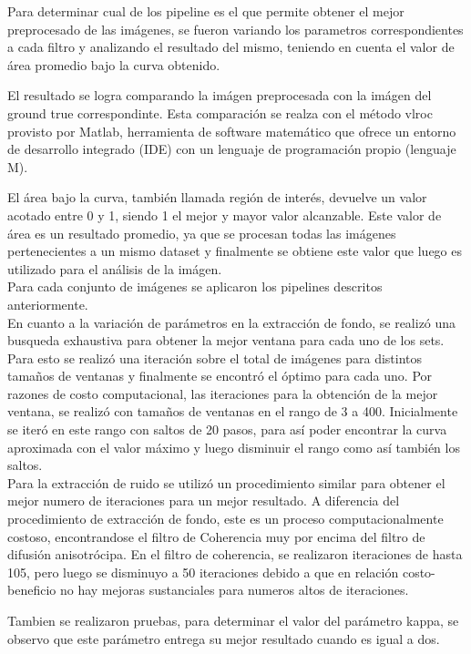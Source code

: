 Para determinar cual de los pipeline es el que permite obtener el mejor preprocesado de las imágenes, se fueron variando los parametros correspondientes a cada filtro y analizando el resultado del mismo, teniendo en cuenta el valor de área promedio bajo la curva obtenido.

El resultado se logra comparando la imágen preprocesada con la imágen del ground true correspondinte. Esta comparación se realza con el método vlroc provisto por Matlab,  herramienta de software matemático que ofrece un entorno de desarrollo integrado (IDE) con un lenguaje de programación propio (lenguaje M). 

El área bajo la curva, también llamada región de interés, devuelve un valor acotado entre 0 y 1, siendo 1 el mejor y mayor valor alcanzable. Este valor de área es un resultado promedio, ya que se procesan todas las imágenes pertenecientes a un mismo dataset y finalmente se obtiene este valor que luego es utilizado para el análisis de la imágen.\\

Para cada conjunto de imágenes se aplicaron los pipelines descritos anteriormente.\\
En cuanto a la variación de parámetros en la extracción de fondo, se realizó una busqueda exhaustiva para obtener la mejor ventana para cada uno de los sets. Para esto se realizó una iteración sobre el total de imágenes para distintos tamaños de ventanas y finalmente se encontró el óptimo para cada uno. Por razones de costo computacional, las iteraciones para la obtención de la mejor ventana, se realizó con tamaños de ventanas en el rango de 3 a 400. Inicialmente se iteró en este rango con saltos de 20 pasos, para así poder encontrar la curva aproximada con el valor máximo y luego disminuir el rango como así también los saltos.\\

Para la extracción de ruido se utilizó un procedimiento similar para obtener el mejor numero de iteraciones para un mejor resultado. A diferencia del procedimiento de extracción de fondo, este es un proceso computacionalmente costoso, encontrandose el filtro de Coherencia muy por encima del filtro de difusión anisotrócipa.
En el filtro de coherencia, se realizaron iteraciones de hasta 105, pero luego se disminuyo a 50 iteraciones debido a que en relación costo-beneficio no hay mejoras sustanciales para numeros altos de iteraciones.

Tambien se realizaron pruebas, para determinar el valor del parámetro kappa, se observo que este parámetro entrega su mejor resultado cuando es igual a dos.


